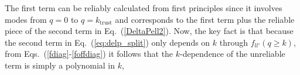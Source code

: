                                                                                                                                                                                                                                                                             The first term can be reliably calculated from first principles 
                                                                                                                                                                                                                                                                            since it involves modes from $q=0$ to $q=k_\mathrm{trust}$ and corresponds to  the first term  plus the reliable piece of the second term in Eq.~(\ref{DeltaPell2}). Now, the key fact is that because the second term in Eq.~(\ref{eq:delp_split}) only depends on $k$ through $f_{l l'}(q\geq k)$, from Eqs.~(\ref{fdiag}-\ref{foffdiag}) it follows that the $k$-dependence of the unreliable term is simply a polynomial in $k$,
